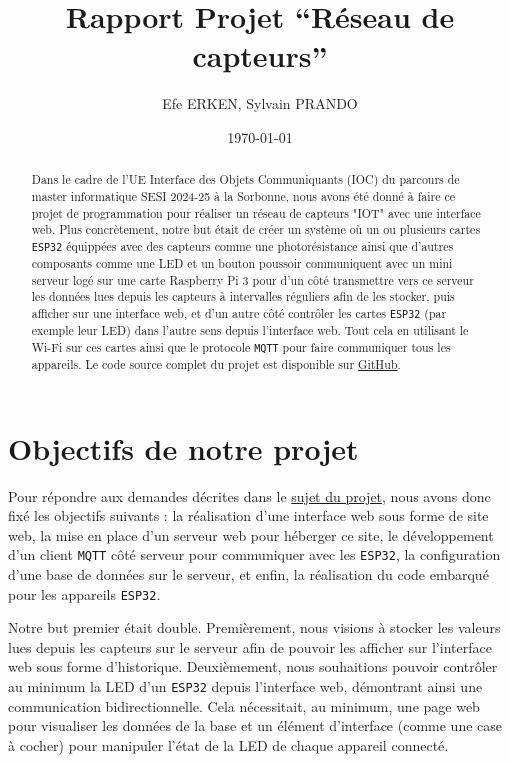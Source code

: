 \documentclass[12pt]{article}
\author{Efe ERKEN, Sylvain PRANDO}
\date{\today}
\title{Rapport Projet ``Réseau de capteurs''}
\begin{document}
\maketitle

\begin{abstract}
    Dans le cadre de l'UE Interface des Objets Communiquants (IOC) du parcours de master informatique SESI 2024-25 à la
    Sorbonne, nous avons été donné à faire ce projet de programmation pour réaliser un réseau de capteurs "IOT" avec une
    interface web.
    Plus concrètement, notre but était de créer un système où un ou plusieurs cartes \texttt{ESP32} équippées avec des
    capteurs comme une photorésistance ainsi que d'autres composants comme une LED et un bouton poussoir communiquent avec
    un mini serveur logé sur une carte Raspberry Pi 3 pour d'un côté transmettre vers ce serveur les données lues depuis les
    capteurs à intervalles réguliers afin de les stocker, puis afficher sur une interface web, et d'un autre côté contrôler les cartes \texttt{ESP32} (par
    exemple leur LED) dans l'autre sens depuis l'interface web. Tout cela en utilisant le Wi-Fi sur ces cartes ainsi que le
    protocole \texttt{MQTT} pour faire communiquer tous les appareils.
    Le code source complet du projet est disponible sur \href{https://github.com/GreengagePlum/Project-IOT}{GitHub}.
\end{abstract}

\section{Objectifs de notre projet}
Pour répondre aux demandes décrites dans le \href{https://github.com/GreengagePlum/Project-IOT/blob/v1.0.0/IOC_mode_projet – SESI.pdf}{sujet du projet}, nous avons donc fixé les objectifs suivants : la réalisation d'une interface web sous forme de site web, la mise en place d'un serveur web pour héberger ce site, le développement d'un client \texttt{MQTT} côté serveur pour communiquer avec les \texttt{ESP32}, la configuration d'une base de données sur le serveur, et enfin, la réalisation du code embarqué pour les appareils \texttt{ESP32}.

Notre but premier était double. Premièrement, nous visions à stocker les valeurs lues depuis les capteurs sur le serveur afin de pouvoir les afficher sur l'interface web sous forme d'historique. Deuxièmement, nous souhaitions pouvoir contrôler au minimum la LED d'un \texttt{ESP32} depuis l'interface web, démontrant ainsi une communication bidirectionnelle. Cela nécessitait, au minimum, une page web pour visualiser les données de la base et un élément d'interface (comme une case à cocher) pour manipuler l'état de la LED de chaque appareil connecté.
\end{document}
